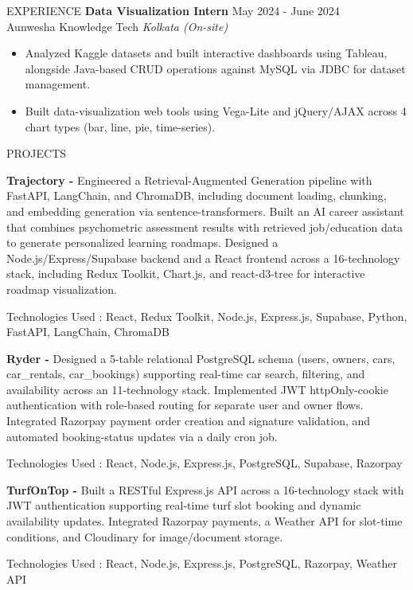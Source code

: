 \documentclass{resume} %
\begin{document}
\begin{rSection}{EXPERIENCE}
\textbf{Data Visualization Intern} \hfill May 2024 - June 2024\\
Aunwesha Knowledge Tech \hfill \textit{Kolkata (On-site)}
 \begin{itemize}
    \itemsep -2pt {}
     \item Analyzed Kaggle datasets and built interactive dashboards using Tableau, alongside Java-based CRUD operations against MySQL via JDBC for dataset management.
     \item Built data-visualization web tools using Vega-Lite and jQuery/AJAX across 4 chart types (bar, line, pie, time-series).
 \end{itemize}

\end{rSection}


\begin{rSection}{PROJECTS}
\vspace{-1.25em}

\item \textbf{Trajectory -} {Engineered a Retrieval-Augmented Generation pipeline with FastAPI, LangChain, and ChromaDB, including document loading, chunking, and embedding generation via sentence-transformers. Built an AI career assistant that combines psychometric assessment results with retrieved job/education data to generate personalized learning roadmaps. Designed a Node.js/Express/Supabase backend and a React frontend across a 16-technology stack, including Redux Toolkit, Chart.js, and react-d3-tree for interactive roadmap visualization.}

{Technologies Used : React, Redux Toolkit, Node.js, Express.js, Supabase, Python, FastAPI, LangChain, ChromaDB}

\item \textbf{Ryder -} {Designed a 5-table relational PostgreSQL schema (users, owners, cars, car\_rentals, car\_bookings) supporting real-time car search, filtering, and availability across an 11-technology stack. Implemented JWT httpOnly-cookie authentication with role-based routing for separate user and owner flows. Integrated Razorpay payment order creation and signature validation, and automated booking-status updates via a daily cron job.}

{Technologies Used : React, Node.js, Express.js, PostgreSQL, Supabase, Razorpay}

\item \textbf{TurfOnTop -} {Built a RESTful Express.js API across a 16-technology stack with JWT authentication supporting real-time turf slot booking and dynamic availability updates. Integrated Razorpay payments, a Weather API for slot-time conditions, and Cloudinary for image/document storage.}

{Technologies Used : React, Node.js, Express.js, PostgreSQL, Razorpay, Weather API}

\end{rSection}
\end{document}
